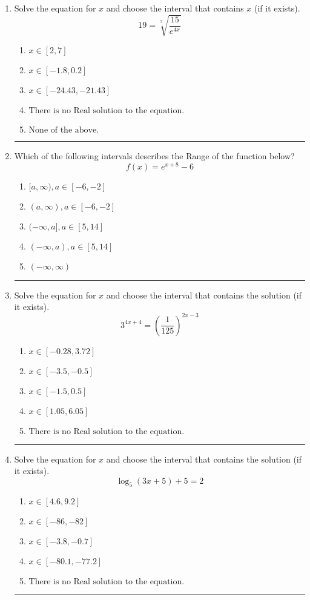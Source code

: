 \documentclass[14pt]{extbook}
\newcommand{\litem}[1]{\item#1\hspace*{-1cm}\rule{\textwidth}{0.4pt}}
\begin{document}
\begin{enumerate}
{\begin{enumerate}[label=\Alph*.]
\end{enumerate} }
\litem{
 Solve the equation for $x$ and choose the interval that contains $x$ (if it exists).\[  19 = \sqrt[5]{\frac{15}{e^{4x}}} \]\begin{enumerate}[label=\Alph*.]
\item \( x \in [2, 7] \)
\item \( x \in [-1.8, 0.2] \)
\item \( x \in [-24.43, -21.43] \)
\item \( \text{There is no Real solution to the equation.} \)
\item \( \text{None of the above.} \)

\end{enumerate} }
\litem{
Which of the following intervals describes the Range of the function below?\[ f(x) = e^{x+8}-6 \]\begin{enumerate}[label=\Alph*.]
\item \( [a, \infty), a \in [-6, -2] \)
\item \( (a, \infty), a \in [-6, -2] \)
\item \( (-\infty, a], a \in [5, 14] \)
\item \( (-\infty, a), a \in [5, 14] \)
\item \( (-\infty, \infty) \)

\end{enumerate} }
\litem{
Solve the equation for $x$ and choose the interval that contains the solution (if it exists).\[ 3^{4x+4} = \left(\frac{1}{125}\right)^{2x-3} \]\begin{enumerate}[label=\Alph*.]
\item \( x \in [-0.28, 3.72] \)
\item \( x \in [-3.5, -0.5] \)
\item \( x \in [-1.5, 0.5] \)
\item \( x \in [1.05, 6.05] \)
\item \( \text{There is no Real solution to the equation.} \)

\end{enumerate} }
\litem{
Solve the equation for $x$ and choose the interval that contains the solution (if it exists).\[ \log_{5}{(3x+5)}+5 = 2 \]\begin{enumerate}[label=\Alph*.]
\item \( x \in [4.6, 9.2] \)
\item \( x \in [-86, -82] \)
\item \( x \in [-3.8, -0.7] \)
\item \( x \in [-80.1, -77.2] \)
\item \( \text{There is no Real solution to the equation.} \)


\end{enumerate}}
\end{enumerate}
\end{document}
